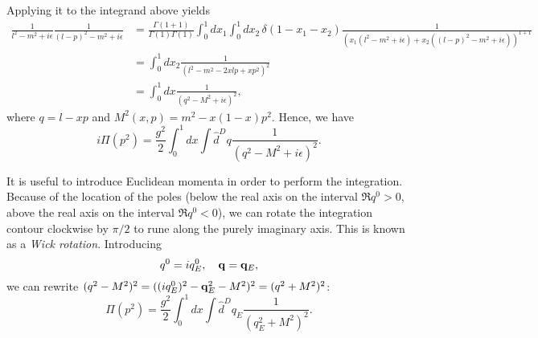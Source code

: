 \documentclass{article}
\numberwithin{equation}{section}
\begin{document}
Applying it to the integrand above yields 
\begin{equation}
\begin{aligned}
    \frac{1}{l^2 - m^2 + i\epsilon} \frac{1}{(l - p)^2 - m^2 + i\epsilon} &= \frac{\Gamma(1+1)}{\Gamma(1) \Gamma(1)} \int_0^1 dx_1 \int_0^1 dx_2\, \delta(1-x_1-x_2) \frac{1}{(x_1(l^2-m^2+i\epsilon) + x_2((l-p)^2 - m^2 + i\epsilon))^{1+1}} \\
    &= \int_0^1 dx_2 \frac{1}{(l^2 - m^2 - 2xlp + xp^2)^2} \\
    &= \int_0^1 dx \frac{1}{(q^2 - M^2 + i\epsilon)^2},
\end{aligned}
\end{equation}
where $q = l - xp$ and $M^2(x, p) = m^2 - x(1-x)p^2$. Hence, we have 
\begin{equation}
    i\Pi(p^2) = \frac{g^2}{2} \int_0^1 dx \int \hat{d}^Dq \frac{1}{(q^2 - M^2 + i\epsilon)^2}.
\end{equation}

It is useful to introduce Euclidean momenta in order to perform the integration. Because of the location of the poles (below the real axis on the interval $\Re q^0 > 0$, above the real axis on the interval $\Re q^0 < 0$), we can rotate the integration contour clockwise by $\pi/2$ to rune along the purely imaginary axis. This is known as a \textit{Wick rotation}. Introducing 
\begin{equation}
    q^0 = i q_E^0, \quad \vb{q} = \vb{q}_E,
\end{equation}
we can rewrite $(q^2 - M^2)^2 = ((iq^0_E)^2 - \vb{q}_E^2 - M^2)^2 = (q^2 + M^2)^2$:
\begin{equation} \label{eq:pi}
    \Pi(p^2) = \frac{g^2}{2} \int_0^1 dx \int \hat{d}^Dq_E \frac{1}{(q_E^2 + M^2)^2}.
\end{equation}
\end{document}
